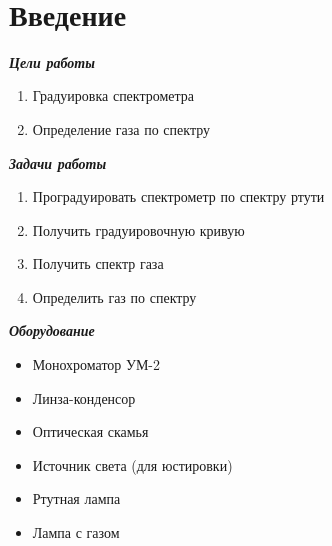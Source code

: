 \documentclass[a4paper]{article}
\begin{document}
	
	\begin{center}
		
		\  \vskip 10cm
		
		\fontsize{20}{18} \selectfont {Лабораторная работа № 6: Градуировка спектрометра}
		
		\vskip 0.5mm
		
		\fontsize{14}{16} 
		
		\thispagestyle{empty}
		\newpage
		
	\end{center}

	\section*{Введение}
	
		\begin{flushleft}
		
			\fontsize{14}{0pt} \selectfont \textbf{\textit{Цели работы}}
			
			\begin{enumerate}
					
					\item Градуировка спектрометра
					\item Определение газа по спектру
	
			\end{enumerate}
		
			\fontsize{14}{0pt} \selectfont \textbf{\textit{Задачи работы}}
			
			\begin{enumerate}
				
				\item Проградуировать спектрометр по спектру ртути
				\item Получить градуировочную кривую
				\item Получить спектр газа
				\item Определить газ по спектру
				
			\end{enumerate}
		
			\fontsize{14}{0pt} \selectfont \textbf{\textit{Оборудование}}
			
			\begin{itemize}
				
				\item Монохроматор УМ-2
				\item Линза-конденсор
				\item Оптическая скамья
				\item Источник света (для юстировки)
				\item Ртутная лампа
				\item Лампа с газом
				
			\end{itemize}
		
		\end{flushleft}
	
\end{document}

